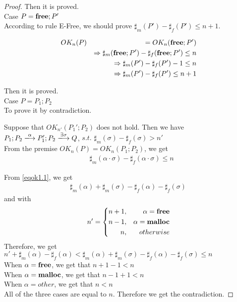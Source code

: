 \begin{proof}
Then it is proved.\\

\noindent Case $P = \mathbf{free};P'$ \\

According to rule E-Free, we should prove $\sharp_{m}(P') - \sharp_{f}(P') \le n+1$.

\begin{eqnarray*}
  OK_{n}(P)  & & =  OK_{n}(\mathbf{free};P')\\
  & &\Rightarrow  \sharp_{m}(\mathbf{free};P') - \sharp_{f}(\mathbf{free};P') \le n \\
  & & \Rightarrow \sharp_{m}(P')  - \sharp_{f}(P') - 1  \le n\\
  & & \Rightarrow \sharp_{m}(P')  - \sharp_{f}(P') \le n+1\\
\end{eqnarray*}

Then it is proved. \\

\noindent Case $P = P_{1};P_{2}$\\

To prove it by contradiction.

Suppose that $OK_{n'}(P_{1}';P_{2})$ does not hold. Then we have 
$P_{1};P_{2} \xlongrightarrow{\alpha} P_{1}';P_{2} \xlongrightarrow{\exists \sigma} Q$, $s.t.$ $\sharp_{m}(\sigma) - \sharp_{f}(\sigma) > n'$\\

From the premise $OK_{n}(P) = OK_{n}(P_{1};P_{2})$, we get 
\setcounter{equation}{0}
\begin{align}
  &  \sharp_{m}(\alpha \cdot \sigma) - \sharp_{f}(\alpha \cdot \sigma) \le n \label{eqok1.1}
\end{align}

From \eqref{eqok1.1}, we get
\begin{align}
\sharp_{m}(\alpha) + \sharp_{m}(\sigma) - \sharp_{f}(\alpha) - \sharp_{f}(\sigma) \  \label{eqok1.2}
\end{align}
and with
$$
   n'=\left\{
   \begin{aligned}
     n + 1, && \alpha = \mathbf{free} \\
     n - 1,  && \alpha = \mathbf{malloc}  \\
     n ,      && otherwise
   \end{aligned}
   \right.
$$
Therefore, we get \\
$n' + \sharp_{m}(\alpha) - \sharp_{f}(\alpha) < \sharp_{m}(\alpha) + \sharp_{m}(\sigma) - \sharp_{f}(\alpha) - \sharp_{f}(\sigma) \le n $ \\
When $\alpha = \mathbf{free}$, we get that $n + 1 - 1 < n$\\
When $\alpha = \mathbf{malloc}$, we get that $ n - 1 + 1 < n $ \\
When $ \alpha = other$,  we  get that $ n < n $ \\
 All of the three cases are equal to $n$. Therefore we get the contradiction.
\end{proof}

